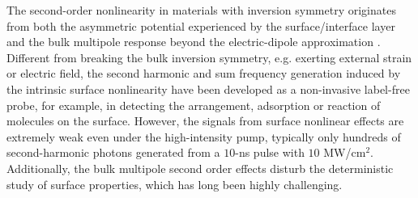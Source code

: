 \documentclass[a4paper,8pt,hyperref, twocolumn]{article}
\begin{document}
The second-order nonlinearity in materials with inversion symmetry originates from both the asymmetric potential experienced by the surface/interface layer and the bulk multipole response beyond the electric-dipole approximation \cite{shen1989surface, heinz1991second}. 
Different from breaking the bulk inversion symmetry, e.g. exerting external strain or electric field, the second harmonic and sum frequency generation induced by the intrinsic surface nonlinearity have been developed as a non-invasive label-free probe, for example, in detecting the arrangement,  adsorption or reaction of molecules on the surface.  %
However, the signals from surface nonlinear effects are extremely weak even under the high-intensity pump, typically only hundreds of second-harmonic photons generated from a $10$-ns pulse with $10$ MW/cm$^{2}$. 
Additionally, the bulk multipole second order effects disturb the deterministic study of surface properties, which has long been highly challenging.
\end{document}
